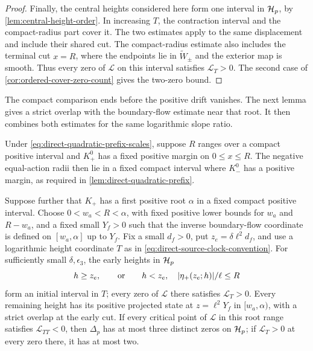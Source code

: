 \begin{proof}
Finally, the central heights considered here form one interval in
\(\mathcal H_p\), by \cref{lem:central-height-order}. In increasing \(T\),
the contraction interval and the compact-radius part cover it.
The two estimates apply to the same displacement and include their
shared cut. The compact-radius estimate also includes the terminal cut
\(x=R\), where the endpoints lie in \(\widetilde W_\pm\) and the
exterior map is smooth.
Thus every zero of \(\mathcal L\) on this interval satisfies
\(\mathcal L_T>0\). The second case of
\cref{cor:ordered-cover-zero-count} gives the two-zero bound.
\end{proof}

The compact comparison ends before the positive drift vanishes.
The next lemma gives a strict overlap with the boundary-flow estimate
near that root. It then combines both estimates for the same
logarithmic slope ratio.

\begin{lemma}
\label{lem:prefix-root-cover}
Under \eqref{eq:direct-quadratic-prefix-scales}, suppose \(R\) ranges
over a compact positive interval
and \(K_+^0\) has a fixed positive margin on \(0\le x\le R\).
The negative equal-action radii then lie in a fixed compact interval
where \(K_-^0\) has a positive margin, as required in
\cref{lem:direct-quadratic-prefix}.

Suppose further that \(K_+\) has a first positive root \(\alpha\) in a
fixed compact positive interval. Choose \(0<w_a<R<\alpha\), with fixed
positive lower bounds for \(w_a\) and \(R-w_a\), and a fixed small
\(Y_f>0\) such that the inverse boundary-flow coordinate is defined on
\([w_a,\alpha]\) up to \(Y_f\). Fix a small \(d_f>0\), put
\(z_e=\delta\ell^2d_f\), and use a logarithmic height coordinate \(T\)
as in \eqref{eq:direct-source-clock-convention}. For sufficiently small
\(\delta,\epsilon_3\), the early heights in \(\mathcal H_p\)
\[
 h\ge z_e,\qquad\hbox{or}\qquad
 h<z_e,\quad |\eta_+(z_e;h)|/\ell\le R
\]
form an initial interval in \(T\); every zero of \(\mathcal L\) there
satisfies \(\mathcal L_T>0\). Every remaining height has its positive
projected state at \(z=\ell^2Y_f\) in \([w_a,\alpha)\), with a strict overlap at the
early cut. If every critical point of \(\mathcal L\) in this root range
satisfies \(\mathcal L_{TT}<0\), then \(\Delta_p\) has at most three distinct
zeros on \(\mathcal H_p\); if \(\mathcal L_T>0\) at every zero there, it has at
most two.
\end{lemma}

